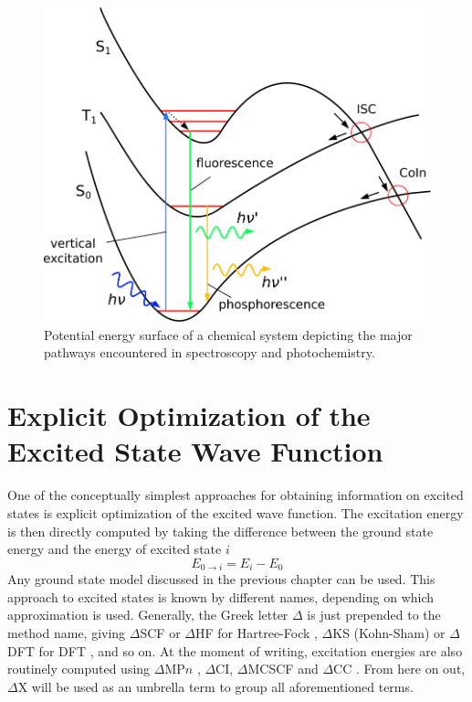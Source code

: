 \begin{figure}
\centering
\includegraphics[scale=0.8]{Pics/PESEX}
\caption{Potential energy surface of a chemical system depicting the major pathways encountered in spectroscopy and photochemistry.}
\label{fig:PESEX}
\end{figure}

\section{Explicit Optimization of the Excited State Wave Function}

One of the conceptually simplest approaches for obtaining information on excited states is explicit optimization of the excited wave function. The excitation energy is then directly computed by taking the difference between the ground state energy and the energy of excited state $i$
\begin{equation}
E_{0\rightarrow i} = E_i - E_0 
\end{equation} 
\noindent Any ground state model discussed in the previous chapter can be used. This approach to excited states is known by different names, depending on which approximation is used. Generally, the Greek letter $\Delta$ is just prepended to the method name, giving $\Delta$SCF or $\Delta$HF for Hartree-Fock \cite{Bag1965,Deu1976,Amb2019}, $\Delta$KS (Kohn-Sham) or $\Delta$DFT for DFT \cite{Tri1999,Tak2003,Bes2009}, and so on. At the moment of writing, excitation energies are also routinely computed using $\Delta$MP$n$ \cite{Hol2011}, $\Delta$CI, $\Delta$MCSCF \cite{Sch2015} and $\Delta$CC \cite{Hol2011,Zhe2019}. From here on out, $\Delta$X will be used as an umbrella term to group all aforementioned terms. 

